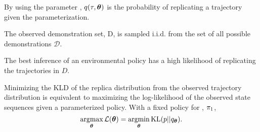     \noindent
    By using the parameter \paramVec, $q(\tau,\boldsymbol{\mathbb{\theta}})$ is the probability of replicating a trajectory given the
    parameterization.

    \begin{assumption}
        The observed demonstration set, D, is sampled i.i.d. from the set of all possible demonstrations $\mathcal{D}$.
    \end{assumption}

    The best inference of an environmental policy has a high likelihood of replicating the trajectories in $D$.
    \begin{lemma}\label{lemma:obj_fun_equiv}
        Minimizing the \ac{KLD} of the replica distribution from the observed trajectory distribution is equivalent to
        maximizing the log-likelihood of the observed state sequences given a parameterized policy. With a fixed policy
        for , $\pi_{1}$,
        \begin{equation*}
            \mathop{\mathrm{argmax}}_{\boldsymbol{\mathbb{\theta}}} \mathcal{L}(\boldsymbol{\mathbb{\theta}}) = \mathop{\mathrm{argmin}}_{\boldsymbol{\mathbb{\theta}}} \text{KL}(p||q_{\boldsymbol{\mathbb{\theta}}}).
        \end{equation*}
    \end{lemma}

